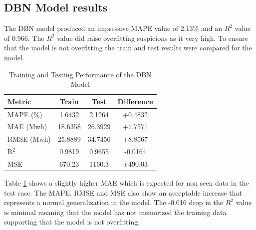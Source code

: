 
 \subsection{DBN Model results \label{sec:dbn results}}
 The DBN model produced an impressive MAPE value of 2.13\% and an $R^2$ value of 0.966. The $R^2$ value did raise overfitting suspicions as it very high. To ensure that the model is not overfitting the train and test results were compared for the model.
 \begin{table}[h!]
 	\centering
 	\caption{Training and Testing Performance of the DBN Model}
 	\label{tab:dbn_performance}
 	\begin{tabular}{lccc}
 		\hline
 		\textbf{Metric} & \textbf{Train} & \textbf{Test} & \textbf{Difference} \\ \hline
 		MAPE (\%) & 1.6432 & 2.1264 & +0.4832 \\
 		MAE (Mwh) & 18.6358 & 26.3929 & +7.7571 \\
 		RMSE (Mwh) & 25.8889 & 34.7456 & +8.8567 \\
 		R$^2$ & 0.9819 & 0.9655 & -0.0164 \\
 		MSE & 670.23 & 1160.3 & +490.03 \\ \hline
 	\end{tabular}
 \end{table}
  Table \ref{tab:dbn_performance} shows a slightly higher MAE which is expected for non seen data in the test case. The MAPE, RMSE and MSE also show an acceptable increase that represents a normal generalization in the model. The -0.016 drop in the $R^2$ value is minimal meaning that the model has not memorized the training data supporting that the model is not overfitting.

